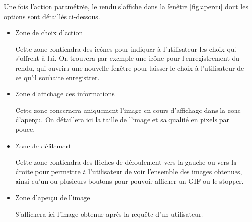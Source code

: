 Une fois l'action paramétrée, le rendu s'affiche dans la fenêtre \ref{fig:apercu} dont les options sont détaillés ci-dessous.

\begin{itemize}

\item Zone de choix d’action
  
  Cette zone contiendra des icônes pour indiquer à l’utilisateur les choix qui s’offrent à lui. On trouvera par exemple une icône pour l’enregistrement du rendu, qui ouvrira une nouvelle fenêtre pour laisser le choix à l’utilisateur de ce qu’il souhaite enregistrer.
  
\item Zone d’affichage des informations
  
  Cette zone concernera uniquement l’image en cours d’affichage dans la zone d’aperçu. On détaillera ici la taille de l’image et sa qualité en pixels par pouce.
  
\item Zone de défilement
  
  Cette zone contiendra des flèches de déroulement vers la gauche ou vers la droite pour permettre à l’utilisateur de voir l’ensemble des images obtenues, ainsi qu’un ou plusieurs boutons pour pouvoir afficher un GIF ou le stopper.
  
\item Zone d’aperçu de l’image
  
  S’affichera ici l’image obtenue après la requête d’un utilisateur.
  
\end{itemize}
